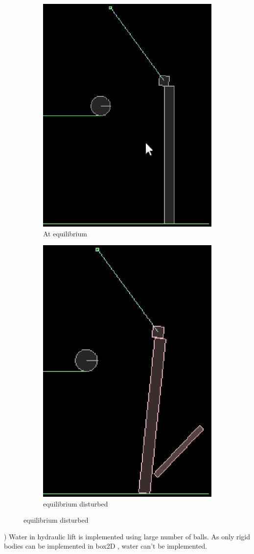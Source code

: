 \documentclass[a4paper,11pt]{article}
\begin{document}
{\begin{figure}[h]
\centering
\begin{subfigure}{.5\textwidth}
  \centering
  \includegraphics[width=.4\linewidth]{images/image7}
  \caption{At equilibrium}
  \label{fig:image7}
\end{subfigure}%
\begin{subfigure}{.5\textwidth}
  \centering
  \includegraphics[width=.4\linewidth]{images/image8}
  \caption{equilibrium disturbed}
  \label{fig:image8}
\end{subfigure}
\end{figure}

) Water in hydraulic lift is implemented using large number of balls. As only rigid bodies can be implemented in box2D , water can't be implemented. \\

}
\end{document}
